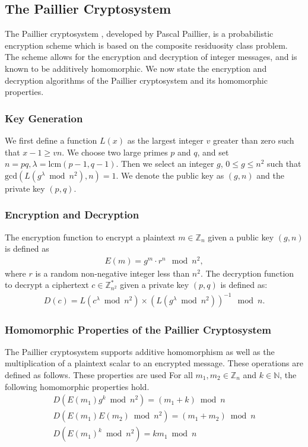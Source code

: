 \subsection{The Paillier Cryptosystem}
The Paillier cryptosystem \cite{stern_public-key_1999}, developed by Pascal Paillier, is a probabilistic encryption scheme which is based on the composite residuosity class problem. The scheme allows for the encryption and decryption of integer messages, and is known to be additively homomorphic. We now state the encryption and decryption algorithms of the Paillier cryptosystem and its homomorphic properties.

\subsubsection{Key Generation}
We first define a function $L(x)$ as the largest integer $v$ greater than zero such that $x-1 \geq vn$.
We choose two large primes $p$ and $q$, and set $n = pq, \lambda = \mathrm{lcm}(p-1,q-1)$.
Then we select an integer $g$, $0\leq g \leq n^2$ such that $\mathrm{gcd}(L(g^\lambda \bmod n^2), n) = 1$.
We denote the public key as $(g,n)$ and the private key $(p,q)$.
\subsubsection{Encryption and Decryption}
The encryption function to encrypt a plaintext $m \in \mathbb{Z}_n$ given a public key $(g,n)$ is defined as
\begin{align*}
	E(m) = g^m \cdot r^n \mod{n^2},
\end{align*}
where $r$ is a random non-negative integer less than $n^2$.
The decryption function to decrypt a ciphertext $c \in \mathbb{Z}^*_{n^2}$ given a private key $(p,q)$ is defined as:
\begin{align*}
	D(c) = L(c^\lambda \bmod n^2) \times (L(g^\lambda \bmod n^2))^{-1} \mod n.
\end{align*}
\subsubsection{Homomorphic Properties of the Paillier Cryptosystem}
The Paillier cryptosystem supports additive homomorphism as well as the multiplication of a plaintext scalar to an encrypted message. These operations are defined as follows. These properties are used
For all $m_1,m_2 \in \mathbb{Z}_n$ and $k\in \mathbb{N}$, the following homomorphic properties hold.
\begin{align*}
	D(E(m_1)g^k\bmod n^2)=(m_1+k)\bmod n\\
	D(E(m_1)E(m_2)\bmod n^2)=(m_1+m_2)\bmod n\\
	D(E(m_1)^k\bmod n^2)= km_1\bmod n
\end{align*}

